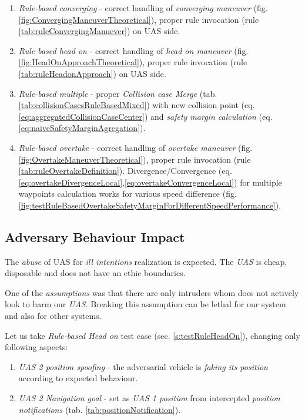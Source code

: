 \begin{enumerate}
    \item \emph{Rule-based converging} - correct handling of \emph{converging maneuver} (fig. \ref{fig:ConvergingManeuverTheoretical}), proper rule invocation (rule \ref{tab:ruleConvergingManuever}) on UAS side.
    
    \item \emph{Rule-based head on} - correct handling of \emph{head on maneuver} (fig. \ref{fig:HeadOnApproachTheoretical}), proper rule invocation (rule \ref{tab:ruleHeadonApproach}) on UAS side. 
    
    \item \emph{Rule-based multiple} - proper \emph{Collision case Merge} (tab. \ref{tab:collisionCasesRuleBasedMixed}) with new collision point (eq. \ref{eq:aggregatedCollisionCaseCenter}) and \emph{safety margin calculation} (eq. \ref{eq:naiveSafetyMarginAgregation}).
    
    \item \emph{Rule-based overtake} - correct handling of \emph{overtake maneuver} (fig. \ref{fig:OvertakeManeuverTheoretical}), proper rule invocation (rule \ref{tab:ruleOvertakeDefinition}). Divergence/Convergence (eq. \ref{eq:overtakeDivergenceLocal},\ref{eq:overtakeConvergenceLocal}) for multiple waypoints calculation works for various speed difference (fig. \ref{fig:testRuleBasedOvertakeSafetyMarginForDifferentSpeedPerformance}).
\end{enumerate}

\subsection{Adversary Behaviour Impact}\label{s:adversadialBehaviourImpact}

The \emph{abuse} of UAS for \emph{ill intentions} realization is expected. The \emph{UAS} is cheap, disposable and does not have an ethic boundaries. 

One of the \emph{assumptions} was that there are only intruders whom does not actively look to harm our \emph{UAS}. Breaking this assumption can be lethal for our system and also for other systems. 

Let us take \emph{Rule-based Head on} test case (sec. \ref{s:testRuleHeadOn}), changing only following aspects:
\begin{enumerate}
	\item \emph{UAS 2 position spoofing} - the adversarial vehicle is \emph{faking its position} according to expected behaviour.
	\item \emph{UAS 2 Navigation goal} - set as \emph{UAS 1 position} from intercepted \emph{position notifications} (tab. \ref{tab:positionNotification}).
\end{enumerate}


